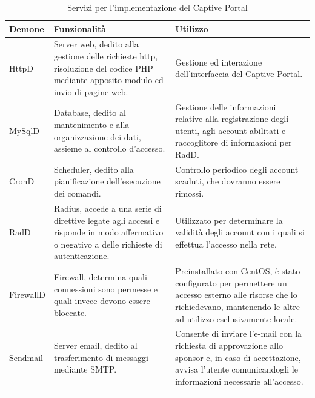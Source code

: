 \documentclass[Realizzazione.tex]{subfiles}
\begin{document}
\label{table:Servizi per l'implementazione del Captive Portal}
\renewcommand*{\arraystretch}{1.2}
\begin{longtable}[H]{p{2.6cm}|p{6cm}|p{6cm}}
	\rowcolor{CHeader}
	\color{CHeaderText} \textbf{Demone} & \color{CHeaderText} \textbf{Funzionalità} & \color{CHeaderText} \textbf{Utilizzo} \\
	\endhead
		HttpD
			& Server web, dedito alla gestione delle richieste http, risoluzione del codice PHP mediante apposito modulo ed invio di pagine web.
			&  Gestione ed interazione dell'interfaccia del Captive Portal. \\
		MySqlD
			& Database, dedito al mantenimento e alla organizzazione dei dati, assieme al controllo d'accesso.
			& Gestione delle informazioni relative alla registrazione degli utenti, agli account abilitati e raccoglitore di informazioni per RadD. \\
		CronD
			& Scheduler, dedito alla pianificazione dell'esecuzione dei comandi.
			& Controllo periodico degli account scaduti, che dovranno essere rimossi. \\
		RadD
			& Radius, accede a una serie di direttive legate agli accessi e risponde in modo affermativo o negativo a delle richieste di autenticazione.
			& Utilizzato per determinare la validità degli account con i quali si effettua l'accesso nella rete. \\
		FirewallD
			& Firewall, determina quali connessioni sono permesse e quali invece devono essere bloccate.
			& Preinstallato con CentOS, è stato configurato per permettere un accesso esterno alle risorse che lo richiedevano, mantenendo le altre ad utilizzo esclusivamente locale. \\
		Sendmail
			& Server email, dedito al trasferimento di messaggi mediante SMTP.
			& Consente di inviare l'e-mail con la richiesta di approvazione allo sponsor e, in caso di accettazione, avvisa l'utente comunicandogli le informazioni necessarie all'accesso. \\
	\hiderowcolors
	\caption{Servizi per l'implementazione del Captive Portal}
\end{longtable}
\end{document}

